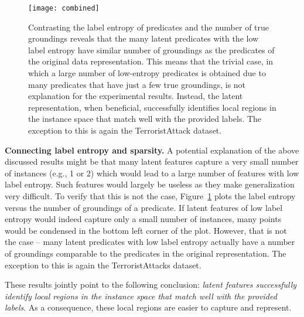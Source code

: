 \begin{figure}
	\centering
	\medskip
    \texttt{[image: combined]}
    \caption{Contrasting the label entropy of predicates and the number of true groundings reveals that the many latent predicates with the low label entropy have similar number of groundings as the predicates of the original data representation. This means that the trivial case, in which a large number of low-entropy predicates is obtained due to many predicates that have just a few true groundings, is not explanation for the experimental results. Instead, the latent representation, when beneficial, successfully identifies local regions in the instance space that match well with the provided labels. The exception to this is again the TerroristAttack dataset.}
    \label{fig:EntropyVsSparsity}
\end{figure}




\textbf{Connecting label entropy and sparsity.}
A potential explanation of the above discussed results might be that many latent features capture a very small number of instances (e.g., 1 or 2) which would lead to a large number of features with low label entropy.
Such features would largely be useless as they make generalization very difficult.
To verify that this is not the case, Figure~\ref{fig:EntropyVsSparsity} plots the label entropy versus the number of groundings of a predicate.
If latent features of low label entropy would indeed capture only a small number of instances, many points would be condensed in the bottom left corner of the plot.
However, that is not the case -- many latent predicates with low label entropy actually have a number of groundings comparable to the predicates in the original representation.
The exception to this is again the TerroristAttacks dataset.

These results jointly point to the following conclusion: \textit{latent features successfully identify local regions in the instance space that match well with the provided labels}.
As a consequence, these local regions are easier to capture and represent.









